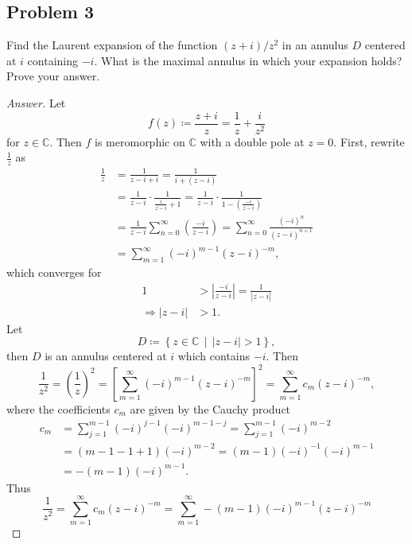 \documentclass[12pt]{article}
\newcommand{\cx}{\mathbb{C}}
\newcommand\paren[1]{\left( #1 \right)}
\newcommand\setb[1]{\left \{ #1 \right \}}
\newcommand{\sqbrack}[1]{\left [ #1 \right ]}
\newcommand{\abs}[1]{\left| #1 \right|}
\theoremstyle{definition}
\begin{document}
\subsection{Problem 3 \texorpdfstring{\cite{Lang}}{}}
Find the Laurent expansion of the function $(z + i)/z^2$ in an annulus $D$ centered at $i$ containing $-i$. What is the maximal annulus in which your expansion holds? Prove your answer. 
\begin{proof}[Answer]
    Let 
    \[
        f(z) \coloneqq \frac{z + i}{z} = \frac{1}{z} + \frac{i}{z^2}
    \]
    for $z \in \cx$. Then $f$ is meromorphic on $\cx$ with a double pole at $z = 0$. First, rewrite $\frac{1}{z}$ as 
    \begin{align*}
        \frac{1}{z} & = \frac{1}{z - i + i} = \frac{1}{i + \paren{ z - i }} \\ 
        & = \frac{1}{z - i} \cdot \frac{1}{ \frac{i}{z - i} + 1 } = \frac{1}{z - i} \cdot \frac{1}{ 1 - \paren{ \frac{-i}{z - i} } } \\ 
        & = \frac{1}{z - i} \sum\limits_{n = 0}^{\infty} \paren{ \frac{-i}{z - i} } = \sum\limits_{n = 0}^{\infty} \frac{(-i)^n}{(z-i)^{n+1}} \\ 
        & = \sum\limits_{m = 1}^{\infty} (-i)^{m-1} (z - i)^{-m} , 
    \end{align*}
    which converges for 
    \begin{align*}
        1 & > \abs{ \frac{-i}{z - i} } = \frac{1}{\abs{z-i}}\\ 
        \Rightarrow \abs{z-i} & > 1 .
    \end{align*}
    Let 
    \[
        D \coloneqq \setb{ z \in \cx \, \middle| \, \abs{z - i} > 1 } , 
    \]
    then $D$ is an annulus centered at $i$ which contains $-i$. Then \[
        \frac{1}{z^2} = \paren{ \frac{1}{z} }^2 = \sqbrack{ \sum\limits_{m = 1}^{\infty} (-i)^{m-1} (z - i)^{-m} }^2 = \sum\limits_{m = 1}^{\infty} c_m \paren{ z - i }^{-m}, 
    \]
    where the coefficients $c_m$ are given by the Cauchy product
    \begin{align*}
        c_m & = \sum\limits_{j = 1}^{m-1} (-i)^{j-1} (-i)^{m-1-j} = \sum\limits_{j = 1}^{m-1} (-i)^{m-2} \\ 
        & = (m-1-1+1) (-i)^{m-2} = (m-1) (-i)^{-1} (-i)^{m-1} \\ 
        & = -(m-1) (-i)^{m-1} .
    \end{align*}
    Thus 
    \[
        \frac{1}{z^2} = \sum\limits_{m = 1}^{\infty} c_m \paren{ z - i }^{-m} = \sum\limits_{m = 1}^{\infty} -(m-1) (-i)^{m-1} \paren{ z - i }^{-m}
\]
\end{proof}
\end{document}
